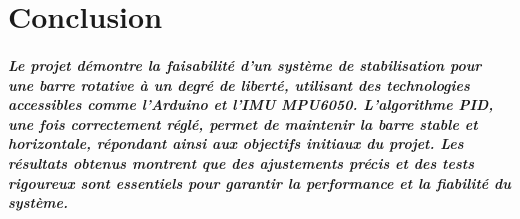 \chapter{Conclusion}


\paragraph{Le projet démontre la faisabilité d'un système de stabilisation pour une barre rotative à un degré de liberté, utilisant des technologies accessibles comme l'Arduino et l'IMU MPU6050. L'algorithme PID, une fois correctement réglé, permet de maintenir la barre stable et horizontale, répondant ainsi aux objectifs initiaux du projet. Les résultats obtenus montrent que des ajustements précis et des tests rigoureux sont essentiels pour garantir la performance et la fiabilité du système.}

